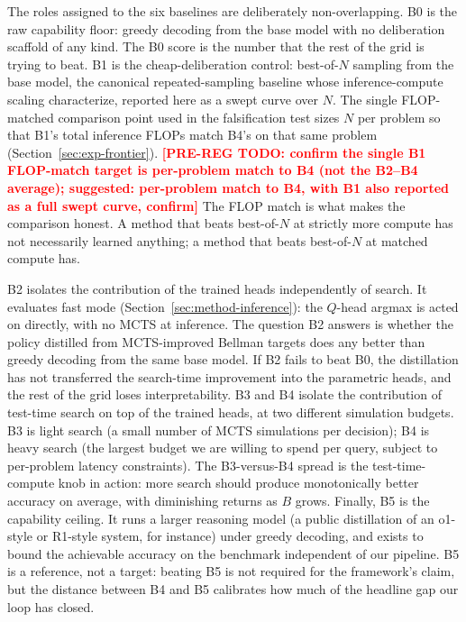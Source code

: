 The roles assigned to the six baselines are deliberately
non-overlapping. B0 is the raw capability floor: greedy decoding from
the base model with no deliberation scaffold of any kind. The B0 score
is the number that the rest of the grid is trying to beat. B1 is the
cheap-deliberation control: best-of-$N$ sampling from the base model,
the canonical repeated-sampling baseline whose inference-compute scaling
\citet{brown2024monkeys} characterize, reported here as a swept curve over
$N$. The single FLOP-matched comparison
point used in the falsification test sizes $N$ per problem so that B1's
total inference FLOPs match B4's on that same problem
(Section~\ref{sec:exp-frontier}).
\textcolor{red}{\textbf{[PRE-REG TODO: confirm the single B1 FLOP-match
target is per-problem match to B4 (not the B2--B4 average); suggested:
per-problem match to B4, with B1 also reported as a full swept curve,
confirm]}}
The FLOP match is what makes the comparison honest. A method that beats
best-of-$N$ at strictly more compute has not necessarily learned
anything; a method that beats best-of-$N$ at matched compute has.

B2 isolates the contribution of the trained heads independently of
search. It evaluates fast mode (Section~\ref{sec:method-inference}):
the $Q$-head argmax is acted on directly, with no MCTS at inference.
The question B2 answers is whether the policy distilled from
MCTS-improved Bellman targets does any better than greedy decoding
from the same base model. If B2 fails to beat B0, the distillation has
not transferred the search-time improvement into the parametric heads,
and the rest of the grid loses interpretability. B3 and B4 isolate the
contribution of test-time search on top of the trained heads, at two
different simulation budgets. B3 is light search (a small number of
MCTS simulations per decision); B4 is heavy search (the largest budget
we are willing to spend per query, subject to per-problem latency
constraints). The B3-versus-B4 spread is the test-time-compute knob in
action: more search should produce monotonically better accuracy on
average, with diminishing returns as $B$ grows. Finally, B5 is the
capability ceiling. It runs a larger reasoning model (a public
distillation of an o1-style or R1-style system, for instance) under
greedy decoding, and exists to bound the achievable accuracy on the
benchmark independent of our pipeline. B5 is a reference, not a target:
beating B5 is not required for the framework's claim, but the distance
between B4 and B5 calibrates how much of the headline gap our loop has
closed.

